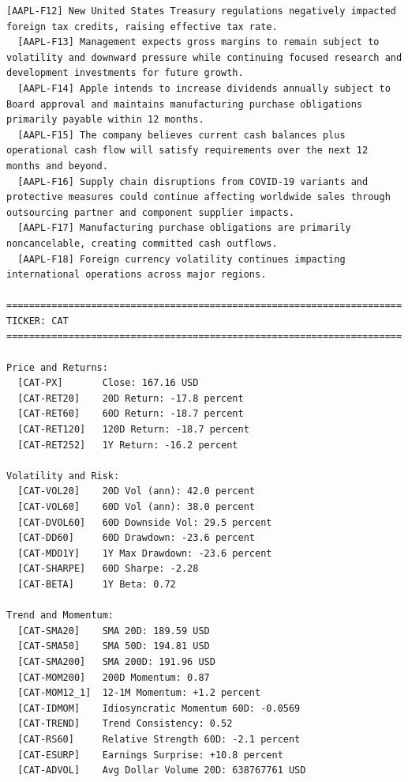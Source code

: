 \documentclass{article}
\begin{document}
\begin{lstlisting}[backgroundcolor=\color{promptbg}]
  [AAPL-F12] New United States Treasury regulations negatively impacted foreign tax credits, raising effective tax rate.
  [AAPL-F13] Management expects gross margins to remain subject to volatility and downward pressure while continuing focused research and development investments for future growth.
  [AAPL-F14] Apple intends to increase dividends annually subject to Board approval and maintains manufacturing purchase obligations primarily payable within 12 months.
  [AAPL-F15] The company believes current cash balances plus operational cash flow will satisfy requirements over the next 12 months and beyond.
  [AAPL-F16] Supply chain disruptions from COVID-19 variants and protective measures could continue affecting worldwide sales through outsourcing partner and component supplier impacts.
  [AAPL-F17] Manufacturing purchase obligations are primarily noncancelable, creating committed cash outflows.
  [AAPL-F18] Foreign currency volatility continues impacting international operations across major regions.

======================================================================
TICKER: CAT
======================================================================

Price and Returns:
  [CAT-PX]       Close: 167.16 USD
  [CAT-RET20]    20D Return: -17.8 percent
  [CAT-RET60]    60D Return: -18.7 percent
  [CAT-RET120]   120D Return: -18.7 percent
  [CAT-RET252]   1Y Return: -16.2 percent

Volatility and Risk:
  [CAT-VOL20]    20D Vol (ann): 42.0 percent
  [CAT-VOL60]    60D Vol (ann): 38.0 percent
  [CAT-DVOL60]   60D Downside Vol: 29.5 percent
  [CAT-DD60]     60D Drawdown: -23.6 percent
  [CAT-MDD1Y]    1Y Max Drawdown: -23.6 percent
  [CAT-SHARPE]   60D Sharpe: -2.28
  [CAT-BETA]     1Y Beta: 0.72

Trend and Momentum:
  [CAT-SMA20]    SMA 20D: 189.59 USD
  [CAT-SMA50]    SMA 50D: 194.81 USD
  [CAT-SMA200]   SMA 200D: 191.96 USD
  [CAT-MOM200]   200D Momentum: 0.87
  [CAT-MOM12_1]  12-1M Momentum: +1.2 percent
  [CAT-IDMOM]    Idiosyncratic Momentum 60D: -0.0569
  [CAT-TREND]    Trend Consistency: 0.52
  [CAT-RS60]     Relative Strength 60D: -2.1 percent
  [CAT-ESURP]    Earnings Surprise: +10.8 percent
  [CAT-ADVOL]    Avg Dollar Volume 20D: 638767761 USD
\end{lstlisting}

\newpage

\end{document}
